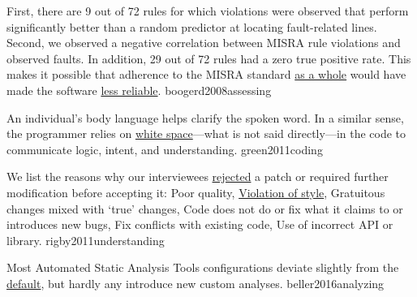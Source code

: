 \documentclass{article}
\begin{document}
  {First, there are 9 out of 72 rules for which violations were observed that perform significantly better than a random predictor at locating fault-related lines. Second, we observed a negative correlation between MISRA rule violations and observed faults. In addition, 29 out of 72 rules had a zero true positive rate. This makes it possible that adherence to the MISRA standard \ul{as a whole} would have made the software \ul{less reliable}.}
  {boogerd2008assessing}

  {An individual's body language helps clarify the spoken word. In a similar sense, the programmer relies on \ul{white space}---what is not said directly---in the code to communicate logic, intent, and understanding.}
  {green2011coding}

  {We list the reasons why our interviewees \ul{rejected} a patch or required further modification before accepting it:
    Poor quality,
    \ul{Violation of style},
    Gratuitous changes mixed with `true' changes,
    Code does not do or fix what it claims to or introduces new bugs,
    Fix conflicts with existing code,
    Use of incorrect API or library.}
  {rigby2011understanding}

  {Most Automated Static Analysis Tools configurations deviate slightly from the \ul{default}, but hardly any introduce new custom analyses. }
  {beller2016analyzing}
\end{document}
